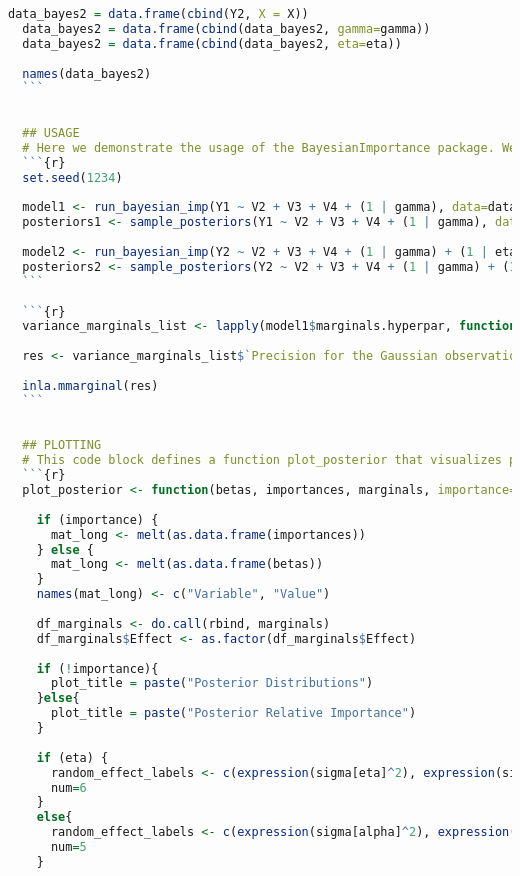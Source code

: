\begin{lstlisting}[language=R, caption=Usage of the Bayesian Importance package with plots and examples.]
  data_bayes2 = data.frame(cbind(Y2, X = X))
  data_bayes2 = data.frame(cbind(data_bayes2, gamma=gamma)) 
  data_bayes2 = data.frame(cbind(data_bayes2, eta=eta))
  
  names(data_bayes2)
  ```
  
  
  ## USAGE
  # Here we demonstrate the usage of the BayesianImportance package. We fit two Bayesian models and sample posterior distributions for different simulated datasets using functions from the package BayesiannImportance. We fit one model with a single random intercept and one model with two random intercepts
  ```{r}
  set.seed(1234)
  
  model1 <- run_bayesian_imp(Y1 ~ V2 + V3 + V4 + (1 | gamma), data=data_bayes1)
  posteriors1 <- sample_posteriors(Y1 ~ V2 + V3 + V4 + (1 | gamma), data=data_bayes1, 5000, n)
  
  model2 <- run_bayesian_imp(Y2 ~ V2 + V3 + V4 + (1 | gamma) + (1 | eta), data=data_bayes2)
  posteriors2 <- sample_posteriors(Y2 ~ V2 + V3 + V4 + (1 | gamma) + (1 | eta), data=data_bayes2, 5000, n)
  ```
  
  ```{r}
  variance_marginals_list <- lapply(model1$marginals.hyperpar, function(x) inla.tmarginal(function(t) 1/t, x))
  
  res <- variance_marginals_list$`Precision for the Gaussian observations`
  
  inla.mmarginal(res)
  ```
  
  
  ## PLOTTING
  # This code block defines a function plot_posterior that visualizes posterior distributions and relative importance from the sampled posteriors. The function creates density plots and overlays line plots for variance marginals. This can be modified for the specific problem at hand, and is not included in the package since it is a problem specific function.
  ```{r}
  plot_posterior <- function(betas, importances, marginals, importance=FALSE, theoretical=FALSE, eta=FALSE) {
    
    if (importance) {
      mat_long <- melt(as.data.frame(importances))
    } else {
      mat_long <- melt(as.data.frame(betas))
    }
    names(mat_long) <- c("Variable", "Value")
    
    df_marginals <- do.call(rbind, marginals)
    df_marginals$Effect <- as.factor(df_marginals$Effect)
    
    if (!importance){
      plot_title = paste("Posterior Distributions")
    }else{
      plot_title = paste("Posterior Relative Importance")
    }
    
    if (eta) {
      random_effect_labels <- c(expression(sigma[eta]^2), expression(sigma[alpha]^2), expression(sigma[epsilon]^2))
      num=6
    }
    else{
      random_effect_labels <- c(expression(sigma[alpha]^2), expression(sigma[epsilon]^2))
      num=5
    }
    

\end{lstlisting}
